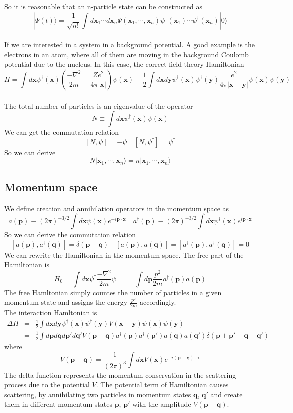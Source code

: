 So it is reasonable that  an n-particle state can be constructed as
\[|\Psi(t)\rangle = \frac{1}{\sqrt{n!}} \int d\bm{x}_1 \cdots d\bm{x}_n \Psi(\bm{x}_1,\cdots,\bm{x}_n) \psi^{\dagger}(\bm{x}_1)\cdots\psi^{\dagger}(\bm{x}_n)|0\rangle\]
\\
If we are interested in a system in a background potential.  
A good example is the electrons in an atom, where all of them are moving in the background Coulomb potential due to the nucleus. In this case, the correct field-theory Hamiltonian
\[H = \int d\bm{x} \psi^{\dagger}(\bm{x}) \left(\frac{-\nabla^2}{2m} - \frac{Ze^2}{4\pi |\bm{x}|} \right)\psi(\bm{x}) + \frac{1}{2}\int d\bm{x} d\bm{y} \psi^{\dagger}(\bm{x}) \psi^{\dagger}(\bm{y}) \frac{e^2}{4\pi|\bm{x}-\bm{y}|} \psi(\bm{x})\psi(\bm{y})\]
\\
The total number of particles is an eigenvalue of the operator
\[N \equiv \int d\bm{x} \psi^{\dagger}(\bm{x})\psi(\bm{x})\]
We can get the commutation relation
\[[N,\psi] = -\psi \quad [N,\psi^{\dagger}] = \psi^{\dagger}\]
So we can derive
\[N|\bm{x}_1,\cdots,\bm{x}_n\rangle = n|\bm{x}_1,\cdots,\bm{x}_n\rangle\]

\subsection{Momentum space}
We define creation and annihilation operators in the
momentum space as
\[a(\bm{p}) \equiv (2\pi)^{-3/2}\int d\bm{x} \psi(\bm{x}) e^{-i\bm{p}\cdot\bm{x}} \quad a^{\dagger}(\bm{p}) \equiv  (2\pi)^{-3/2} \int d\bm{x} \psi^{\dagger}(\bm{x}) e^{i\bm{p}\cdot\bm{x}}\]
So we can derive the commutation relation
\[[a(\bm{p}),a^{\dagger}(\bm{q})] = \delta(\bm{p}-\bm{q}) \quad [a(\bm{p}),a(\bm{q})] = [a^{\dagger}(\bm{p}),a^{\dagger}(\bm{q})] = 0\]
We can rewrite the Hamiltonian in the momentum space. The
free part of the Hamiltonian is
\[H_0 = \int d\bm{x} \psi^{\dagger} \frac{-\nabla^2}{2m} \psi == \int d\bm{p} \frac{p^2}{2m} a^{\dagger}(\bm{p})a(\bm{p})\]
The free Hamltonian simply countes the number of particles in a given momentum state and assigns the energy $\frac{p^2}{2m}$ accordingly. \\
The interaction Hamltonian is
\begin{eqnarray}
\Delta H &=& \frac{1}{2}\int d\bm{x} d\bm{y} \psi^{\dagger}(\bm{x}) \psi^{\dagger}(\bm{y}) V(\bm{x} - \bm{y}) \psi(\bm{x})\psi(\bm{y})  \nonumber \\
&=& \frac{1}{2} \int d\bm{p}d\bm{q}d\bm{p}'d\bm{q}' V(\bm{p}-\bm{q}) a^{\dagger}(\bm{p}) a^{\dagger}(\bm{p}') a(\bm{q}) a(\bm{q}') \delta(\bm{p}+\bm{p}'-\bm{q}-\bm{q}')\nonumber
\end{eqnarray}
where
\[V(\bm{p}-\bm{q}) = \frac{1}{(2\pi)^3} \int d\bm{x} V(\bm{x}) e^{-i(\bm{p}-\bm{q})\cdot\bm{x}}\]
The delta function represents the momentum conservation in the scattering process due to the potential $V$. The potential term of Hamiltonian causes scattering, by annihilating two particles in momentum states $\bm{q}$, $\bm{q}'$ and create them in different momentum states $\bm{p}$, $\bm{p}'$ with the amplitude
$V(\bm{p}-\bm{q})$.

